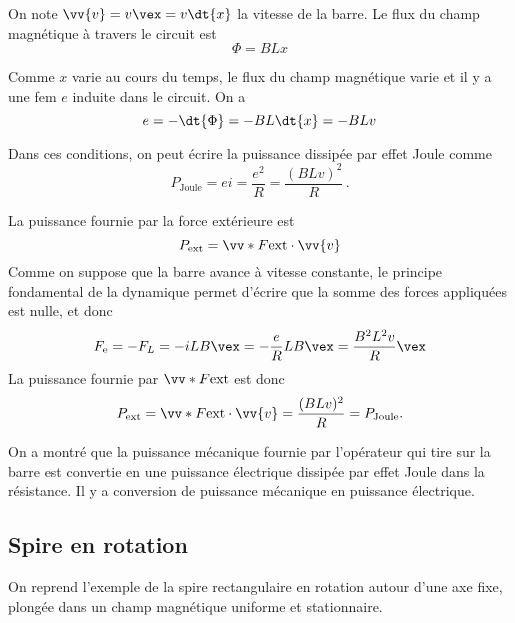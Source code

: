 \documentclass{cours}
\begin{document}
On note $\vv{v}= v \vex = v \dt{x}$ la vitesse de la barre. Le flux du champ magnétique à travers le circuit est 
\begin{equation}
  \Phi = BLx
\end{equation}

Comme $x$  varie au cours du temps, le flux du champ magnétique varie et il y a une fem $e$ induite dans le circuit. On a 
\begin{equation}
  e = -\dt{\Phi} = - BL \dt{x} = -BLv
\end{equation}  

Dans ces conditions, on peut écrire la puissance dissipée par effet Joule comme 
\begin{equation}
  P_\text{Joule} = ei = \frac{e^2}{R} = \frac{(BLv)^2}{R}\, .
\end{equation}

La puissance fournie par la force extérieure est 
\begin{equation}
  P_\text{ext} = \vv*{F}{\text{ext}}\cdot \vv{v}
\end{equation}
Comme on suppose que la barre avance à vitesse constante, le principe fondamental de la dynamique permet d'écrire que la somme des forces appliquées est nulle, et donc 
\begin{equation}
  F_\text{e} = -F_L = -iLB \vex  = -\frac{e}{R}LB \vex  = \frac{B^2L^2v}{R} \vex 
\end{equation}
La puissance fournie par $\vv*{F}{\text{ext}}$ est donc 
\begin{equation}
  P_\text{ext} = \vv*{F}{\text{ext}}\cdot\vv{v} = \frac{(BLv)^2}{R} = P_{\text{Joule}}.
\end{equation}

On a montré que la puissance mécanique fournie par l'opérateur qui tire sur la barre est convertie en une puissance électrique dissipée par effet Joule dans la résistance. Il y a conversion de puissance mécanique en puissance électrique. 

\subsection{Spire en rotation}%
\label{sub:spire_en_rotation}

On reprend l'exemple de la spire rectangulaire en rotation autour d'une axe fixe, plongée dans un champ magnétique uniforme et stationnaire.
\end{document}
